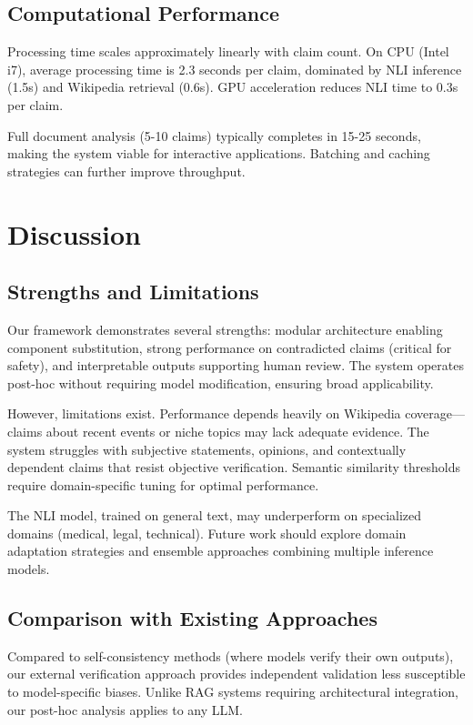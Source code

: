 \documentclass[conference]{IEEEtran}
\begin{document}
\subsection{Computational Performance}

Processing time scales approximately linearly with claim count. On CPU (Intel i7), average processing time is 2.3 seconds per claim, dominated by NLI inference (1.5s) and Wikipedia retrieval (0.6s). GPU acceleration reduces NLI time to 0.3s per claim.

Full document analysis (5-10 claims) typically completes in 15-25 seconds, making the system viable for interactive applications. Batching and caching strategies can further improve throughput.

\section{Discussion}

\subsection{Strengths and Limitations}

Our framework demonstrates several strengths: modular architecture enabling component substitution, strong performance on contradicted claims (critical for safety), and interpretable outputs supporting human review. The system operates post-hoc without requiring model modification, ensuring broad applicability.

However, limitations exist. Performance depends heavily on Wikipedia coverage—claims about recent events or niche topics may lack adequate evidence. The system struggles with subjective statements, opinions, and contextually dependent claims that resist objective verification. Semantic similarity thresholds require domain-specific tuning for optimal performance.

The NLI model, trained on general text, may underperform on specialized domains (medical, legal, technical). Future work should explore domain adaptation strategies and ensemble approaches combining multiple inference models.

\subsection{Comparison with Existing Approaches}

Compared to self-consistency methods (where models verify their own outputs), our external verification approach provides independent validation less susceptible to model-specific biases. Unlike RAG systems requiring architectural integration, our post-hoc analysis applies to any LLM.
\end{document}
